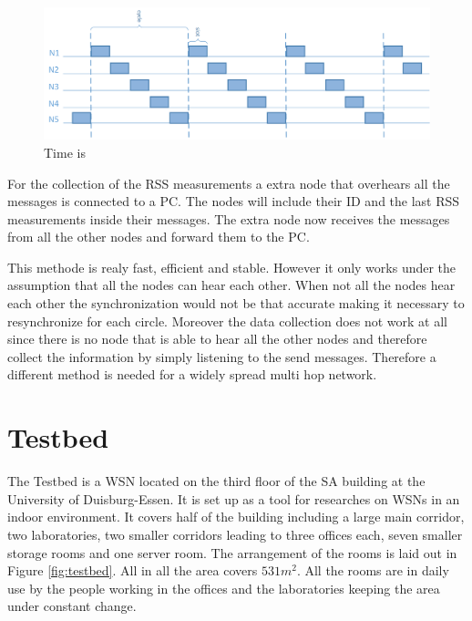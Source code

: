 \begin{figure}[htbp]
	\centering
    \includegraphics[scale=0.8]{content/images/Multispin}
   	\caption{Time is  \cite{RtiMulti}}
    \label{fig:multi}
\end{figure}

For the collection of the RSS measurements a extra node that overhears all the messages is connected to a PC. The nodes will include their ID and the last RSS measurements inside their messages. The extra node now receives the messages from all the other nodes and forward them to the PC.  \cite{RtiMulti}

This methode is realy fast, efficient and stable. However it only works under the assumption that all the nodes can hear each other. When not all the nodes hear each other the synchronization would not be that accurate making it necessary to resynchronize for each circle. Moreover the data collection does not work at all since there is no node that is able to hear all the other nodes and therefore collect the information by simply listening to the send messages.
Therefore a different method is needed for a widely spread multi hop network.

 
\section{Testbed}
The Testbed is a WSN located on the third floor of the SA building at the University of Duisburg-Essen. It is set up as a tool for researches on WSNs in an indoor environment. It covers half of the building including a large main corridor, two laboratories, two smaller corridors leading to three offices each, seven smaller storage rooms and one server room. The arrangement of the rooms is laid out in Figure \ref{fig:testbed}. All in all the area covers $531m^2$. All the rooms are in daily use by the people working in the offices and the laboratories keeping the area under constant change.

